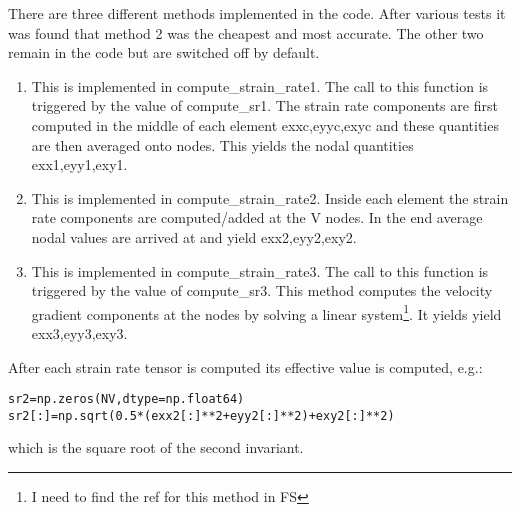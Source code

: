 There are three different methods implemented in the code.
After various tests it was found that method 2 was the 
cheapest and most accurate. The other two remain in the code
but are switched off by default.

\begin{enumerate}
\item This is implemented in {\python compute\_strain\_rate1}. The call to this function 
is triggered by the value of {\python compute\_sr1}. The strain rate components are 
first computed in the middle of each element {\python exxc,eyyc,exyc} and these quantities 
are then averaged onto nodes. This yields the nodal quantities {\python exx1,eyy1,exy1}. 
\item This is implemented in {\python compute\_strain\_rate2}. Inside each element 
the strain rate components are computed/added at the V nodes. In the end average 
nodal values are arrived at and yield {\python exx2,eyy2,exy2}.
  
\item This is implemented in {\python compute\_strain\_rate3}.
The call to this function is triggered by the value of {\python compute\_sr3}. 
This method computes the velocity gradient components at the nodes by solving 
a linear system\footnote{I need to find the ref for this method in FS}.
It yields yield {\python exx3,eyy3,exy3}.

\end{enumerate}

After each strain rate tensor is computed its effective value is computed, e.g.:
\begin{lstlisting}
sr2=np.zeros(NV,dtype=np.float64)
sr2[:]=np.sqrt(0.5*(exx2[:]**2+eyy2[:]**2)+exy2[:]**2)
\end{lstlisting}
which is the square root of the second invariant.


